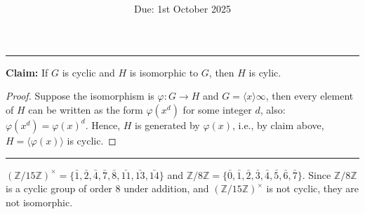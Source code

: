 \documentclass[12pt]{article}
\title{\textbf{\mytitle}}
\author{\textbf{\myauthor}}
\date{Due: 1st October 2025}
\begin{document}
\onehalfspacing
\maketitle

\section{} %
\subsection{} %
\noindent\rule{\textwidth}{1pt}

\textbf{Claim: }If $G$ is cyclic and $H$ is isomorphic to $G$, then $H$ is cylic.
\begin{proof}
Suppose the isomorphism is $\varphi: G\rightarrow H$ and $G=\langle x\rangle\infty$, then every element of $H$ can be written as the form $\varphi(x^d)$ for some integer $d$, also: $\varphi(x^d)=\varphi(x)^d$. Hence, $H$ is generated by $\varphi(x)$, i.e., by claim above, $H=\langle \varphi(x)\rangle$ is cyclic.
\end{proof}

\noindent\rule{\textwidth}{1pt}


$(\mathbb{Z}/15\mathbb{Z})^{\times}=\{\bar{1},\bar{2},\bar{4},\bar{7},\bar{8},\bar{11},\bar{13},\bar{14}\}$ and $\mathbb{Z}/8\mathbb{Z}=\{\bar{0},\bar{1},\bar{2},\bar{3},\bar{4},\bar{5},\bar{6},\bar{7}\}$. Since $\mathbb{Z}/8\mathbb{Z}$ is a cyclic group of order $8$ under addition, and $(\mathbb{Z}/15\mathbb{Z})^{\times}$ is not cyclic, they are not isomorphic.
\subsection{} %
\subsection{} %
\subsection{} %
\subsection{} %
\subsection{} %
\subsection{} %
\end{document}
